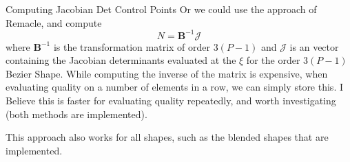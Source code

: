 \documentclass[12pt]{beamer}
\newcommand{\spa}{\vspace{0.5cm}\newline}
\begin{document}
\begin{frame}{Computing Jacobian Det Control Points}
Or we could use the approach of Remacle, and compute
\[
N = \mathbf{B}^{-1}\mathcal{J}
\]
where $\mathbf{B}^{-1}$ is the transformation matrix of order $3(P-1)$ and $\mathcal{J}$ is an vector containing the Jacobian determinants evaluated at the $\xi$ for the order $3(P-1)$ Bezier Shape. While computing the inverse of the matrix is expensive, when evaluating quality on a number of elements in a row, we can simply store this. I Believe this is faster for evaluating quality repeatedly, and worth investigating (both methods are implemented). \spa

This approach also works for all shapes, such as the blended shapes that are implemented.

\end{frame}
\end{document}
